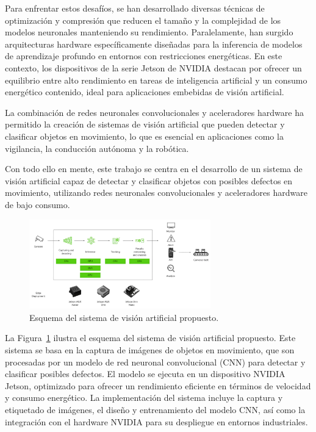 \documentclass[11pt,spanish,listoffigures,listoftables]{tfgetsinf}
\begin{document}
Para enfrentar estos desafíos, se han desarrollado diversas técnicas de optimización y compresión que reducen el tamaño y la complejidad de los modelos neuronales manteniendo su rendimiento. Paralelamente, han surgido arquitecturas hardware específicamente diseñadas para la inferencia de modelos de aprendizaje profundo en entornos con restricciones energéticas. En este contexto, los dispositivos de la serie Jetson de NVIDIA\cite{nvidia_jetson_modules} destacan por ofrecer un equilibrio entre alto rendimiento en tareas de inteligencia artificial y un consumo energético contenido, ideal para aplicaciones embebidas de visión artificial.

La combinación de redes neuronales convolucionales y aceleradores hardware ha permitido la creación de sistemas de visión artificial que pueden detectar y clasificar objetos en movimiento, lo que es esencial en aplicaciones como la vigilancia, la conducción autónoma y la robótica.

Con todo ello en mente, este trabajo se centra en el desarrollo de un sistema de visión artificial capaz de detectar y clasificar objetos con posibles defectos en movimiento, utilizando redes neuronales convolucionales y aceleradores hardware de bajo consumo. 

\begin{figure}[H]
   \centering
   \includegraphics[width=0.7\textwidth]{images/diseno_e_implementacion/figura_TFG_v3.png}
   \caption[Esquema del sistema de visión artificial propuesto]{Esquema del sistema de visión artificial propuesto.}
\label{fig:esquema_TFG}
\end{figure}

La Figura~\ref{fig:esquema_TFG} ilustra el esquema del sistema de visión artificial propuesto. Este sistema se basa en la captura de imágenes de objetos en movimiento, que son procesadas por un modelo de red neuronal convolucional (CNN) para detectar y clasificar posibles defectos. El modelo se ejecuta en un dispositivo NVIDIA Jetson, optimizado para ofrecer un rendimiento eficiente en términos de velocidad y consumo energético. La implementación del sistema incluye la captura y etiquetado de imágenes, el diseño y entrenamiento del modelo CNN, así como la integración con el hardware NVIDIA para su despliegue en entornos industriales.
\end{document}
